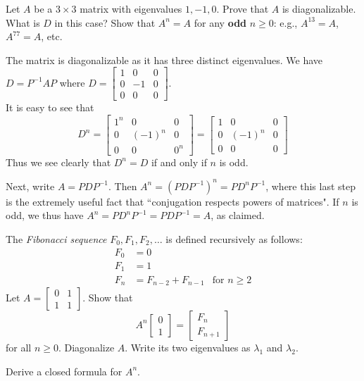 \ii  Let $A$ be a $3\times 3$ matrix with eigenvalues $1, -1, 0$. 
\bb
\ii Prove that $A$ is diagonalizable. What is $D$ in this case?
\ii Show that $A^n=A$ for any {\bf odd} $n\geq 0$: e.g., $A^{13}=A$, $A^{77}=A$, etc.
\ee
\begin{solution}
The matrix is diagonalizable as it has three distinct eigenvalues. We have $D=P^{-1}AP$ where $D=\begin{bmatrix}
1&0&0\\
0&-1&0\\
0&0&0
\end{bmatrix}$. 
\\
It is easy to see that 
\[
D^n=\begin{bmatrix}
1^n&0&0\\
0&(-1)^n&0\\
0&0&0^n
\end{bmatrix}
=\begin{bmatrix}
1&0&0\\
0&(-1)^n&0\\
0&0&0
\end{bmatrix}
\]
Thus we see clearly that $D^n=D$ if and only if $n$ is odd. 

Next, write $A=PDP^{-1}$. Then $A^n=(PDP^{-1})^n=PD^nP^{-1}$, where this last step is the extremely useful fact that ``conjugation respects powers of matrices".  If $n$ is odd, we thus have $A^n=PD^nP^{-1}=PDP^{-1}=A$, as claimed. 
\end{solution}
\ii The {\em Fibonacci sequence} $F_0, F_1, F_2, \dots$ is defined recursively as follows: 
\begin{align*}
F_0&=0\\
F_1&=1\\
F_n&=F_{n-2}+F_{n-1} &\text{for $n\geq 2$}
\end{align*}
Let $A=\begin{bmatrix}
0&1\\
1&1
\end{bmatrix}$.
\bb
\ii Show that 
\[
A^n\begin{bmatrix}
0 \\ 1
\end{bmatrix}=\begin{bmatrix}
F_n\\ F_{n+1}
\end{bmatrix}
\]
for all $n\geq 0$. 
\ii Diagonalize $A$. Write its two eigenvalues as $\lambda_1$ and $\lambda_2$. 

\ii Derive a closed formula for $A^n$. 

